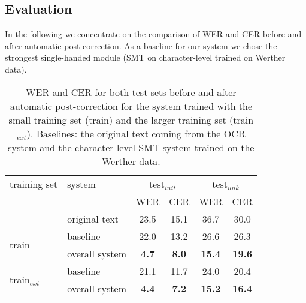 \documentclass[11pt,letterpaper]{article}
\begin{document}
\subsection{Evaluation}

In the following we concentrate on the comparison of WER and CER before and after automatic post-correction. As a baseline for our system we chose the strongest single-handed module (SMT on character-level trained on Werther data). 


\begin{table}
\setlength{\belowcaptionskip}{-10pt}
\centering
\tiny
\begin{tabular}{l|l|cc|cc}
\small training set &\small system& \multicolumn{2}{c|}{\small test$_{init}$}& \multicolumn{2}{c}{\small test$_{unk}$}\\
&&\small WER&\small CER&\small WER&\small CER\\
\toprule
&original text&23.5&15.1&36.7&30.0\\
\midrule
\multirow{2}{*}{\small train}&baseline &22.0&13.2&26.6&26.3\\
&overall system &\textbf{4.7}&\textbf{8.0}&\textbf{15.4}&\textbf{19.6}\\
\midrule
\multirow{2}{*}{\small train$_{ext}$}&baseline&21.1&11.7&24.0&20.4\\
&overall system &\textbf{4.4}&\textbf{7.2}&\textbf{15.2}&\textbf{16.4}\\
\bottomrule
\end{tabular}
\caption{WER and CER for both test sets before and after automatic post-correction for the 
system trained with the small training set (train) and the larger training set (train$_{ext}$). Baselines: the 
original text coming from the OCR system and the character-level SMT system trained on the Werther data.}
\label{tab:res}
\end{table}
\end{document}
